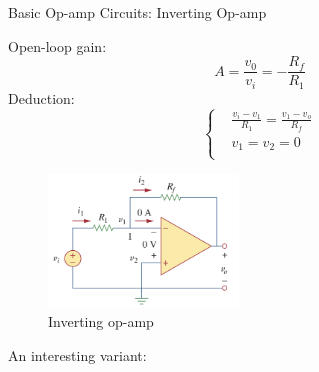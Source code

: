 \documentclass{beamer}
\begin{document}
\begin{frame}{Basic Op-amp Circuits: Inverting Op-amp}

\begin{multicols}{2}
    \sectiont{}
    Open-loop gain:
    $$A = \frac{v_0}{v_i} = -\frac{R_f}{R_1}$$
    Deduction:
    $$\left\{\begin{aligned}
        &\frac{v_i-v_1}{R_1} = \frac{v_1 - v_o}{R_f}\\
        &v_1 = v_2 = 0\\
    \end{aligned}\right.
    $$
    
    \sectiont{}
    \begin{figure}[H]
        \centering
        \includegraphics[width=0.45\textwidth]{img_opamp/5_ inverting.png}
        \caption{Inverting op-amp}
    \end{figure}
\end{multicols}

An interesting variant:


\end{frame}
\end{document}
